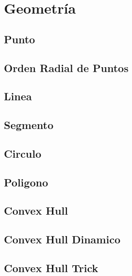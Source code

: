 \newpage
\section{Geometr\'ia}

\subsection{Punto}


\subsection{Orden Radial de Puntos}


\subsection{Linea}


\subsection{Segmento}


\subsection{Circulo}


\subsection{Poligono}


\subsection{Convex Hull}


\subsection{Convex Hull Dinamico}


\subsection{Convex Hull Trick}


